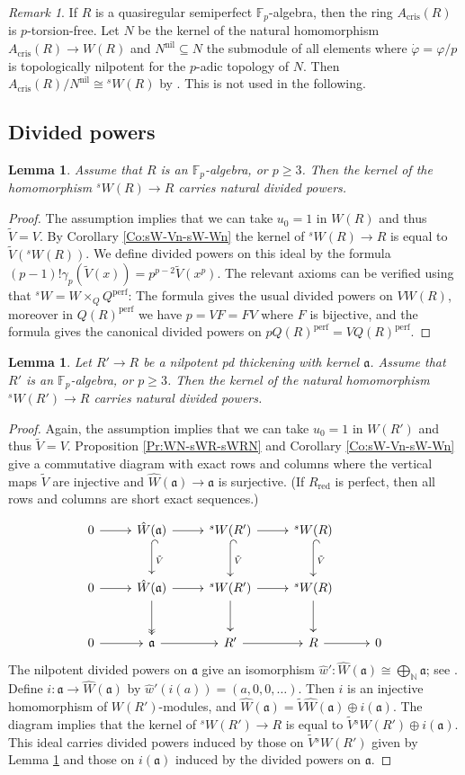 \documentclass[a4paper,11pt]{amsart}
\theoremstyle{plain}
\newtheorem{Lemma}[equation]{Lemma}
\theoremstyle{definition}
\theoremstyle{remark}
\newtheorem{Remark}[equation]{Remark}
\newcommand{\bLe}{\begin{Lemma}}
\newcommand{\eLe}{\end{Lemma}}
\newcommand{\bRe}{\begin{Remark}}
\newcommand{\eRe}{\end{Remark}}
\newcommand{\bproof}{\begin{proof}}
\newcommand{\eproof}{\end{proof}}
\numberwithin{equation}{section}
\newcommand{\Fa}{\mathfrak{a}}
\newcommand{\FF}{{\mathbb{F}}}
\newcommand{\NN}{{\mathbb{N}}}
\DeclareMathOperator{\crys}{cris}
\DeclareMathOperator{\nil}{nil}
\DeclareMathOperator{\perf}{perf}
\DeclareMathOperator{\red}{red}
\newcommand{\limperf}{^{\perf}}
\newcommand{\sW}{{}^sW}
\begin{document}
\bRe
If $R$ is a quasiregular semiperfect $\FF_p$-algebra, then  the ring $A_{\crys}(R)$ is $p$-torsion-free. Let $N$ be the kernel of the natural homomorphism $A_{\crys}(R)\to W(R)$ and $N^{\nil}\subseteq N$ the submodule of all elements where $\dot\varphi=\varphi/p$ is topologically nilpotent for the $p$-adic topology of $N$. 
Then $A_{\crys}(R)/N^{\nil}\cong\sW(R)$ by \cite{Lau:Gerbe}. This is not used in the following.
\eRe

\subsection{Divided powers}
\label{Se:pd-sW}

\bLe
\label{Le:pd-sW}
Assume that $R$ is an $\FF_p$-algebra, or $p\ge 3$.
Then the kernel of the homomorphism $\sW(R)\to R$ carries natural divided powers.
\eLe

\bproof
The assumption implies that we can take $u_0=1$ in $W(R)$ and thus $\tilde V=V$. By Corollary \ref{Co:sW-Vn-sW-Wn} the kernel of  $\sW(R)\to R$ is equal to $\tilde V(\sW(R))$. We define divided powers on this ideal by the formula $(p-1)!\gamma_p(\tilde V(x))=p^{p-2}\tilde V(x^p)$. The relevant axioms can be verified using that $\sW=W\times_QQ\limperf$: The formula gives the usual divided powers on $VW(R)$, moreover in $Q(R)\limperf$ we have $p=VF=FV$ where $F$ is bijective, and the formula gives the canonical divided powers on $pQ(R)\limperf=VQ(R)\limperf$.
\eproof

\bLe
\label{Le:pd-sW-rel}
Let $R'\to R$ be a nilpotent pd thickening with kernel $\Fa$. Assume that $R'$ is an $\FF_p$-algebra, or $p\ge 3$.
Then the kernel of the natural homomorphism $\sW(R')\to R$ carries natural divided powers.
\eLe

\bproof
Again, the assumption implies that we can take $u_0=1$ in $W(R')$ and thus $\tilde V=V$. 
Proposition \ref{Pr:WN-sWR-sWRN} and Corollary \ref{Co:sW-Vn-sW-Wn} give a commutative diagram with exact rows and columns where the vertical maps $\tilde V$ are injective and $\hat W(\Fa)\to\Fa$ is surjective. (If $R_{\red}$ is perfect, then all rows and columns are short exact sequences.)
\[
\xymatrix@M+0.2em{
0 \ar[r] & \hat W(\Fa) \ar[r] \ar@{^(->}[d]^{\tilde V} & \sW(R') \ar[r] \ar@{^(->}[d]^{\tilde V} & \sW(R) \ar@{^(->}[d]^{\tilde V} \\
0 \ar[r] & \hat W(\Fa) \ar[r] \ar@{->>}[d] & \sW(R') \ar[r] \ar[d] & \sW(R) \ar[d] \\
0 \ar[r] & \Fa \ar[r] & R' \ar[r] & R \ar[r] & 0
} %
\]
The nilpotent divided powers on $\Fa$ give an isomorphism $\hat w'\colon \hat W(\Fa)\cong\bigoplus_{\NN}\Fa$; see \cite[(149)]{Zink:The-display}. Define $i\colon \Fa\to\hat W(\Fa)$ by $\hat w'(i(a))=(a,0,0,\ldots)$. Then $i$ is an injective homomorphism of $W(R')$-modules, and $\hat W(\Fa)=\tilde V\hat W(\Fa)\oplus i(\Fa)$. The diagram implies that the kernel of $\sW(R')\to R$ is equal to $\tilde V\sW(R')\oplus i(\Fa)$. This ideal carries divided powers induced by those on $\tilde V\sW(R')$ given by Lemma \ref{Le:pd-sW} and those on $i(\Fa)$ induced by the divided powers on $\Fa$.
\eproof
\end{document}
